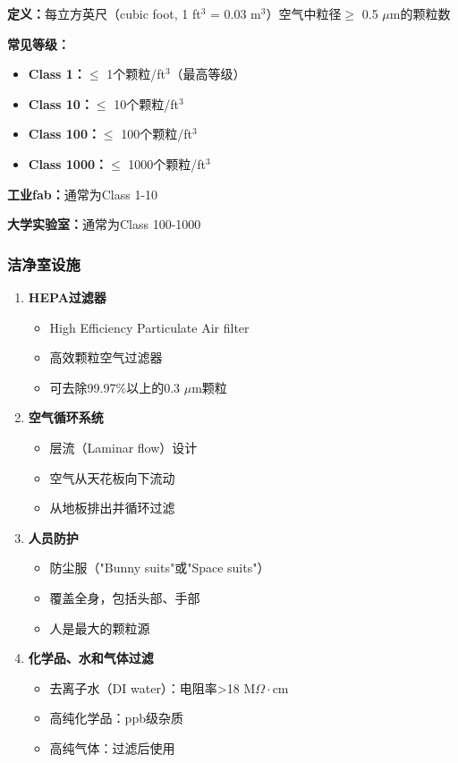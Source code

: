 \documentclass[UTF8,12pt,a4paper]{ctexart}
\begin{document}
\textbf{定义：}每立方英尺（cubic foot, 1 ft$^3$ = 0.03 m$^3$）空气中粒径$\geq$ 0.5 $\mu$m的颗粒数

\textbf{常见等级：}
\begin{itemize}
    \item \textbf{Class 1：}$\leq$ 1个颗粒/ft$^3$（最高等级）
    \item \textbf{Class 10：}$\leq$ 10个颗粒/ft$^3$
    \item \textbf{Class 100：}$\leq$ 100个颗粒/ft$^3$
    \item \textbf{Class 1000：}$\leq$ 1000个颗粒/ft$^3$
\end{itemize}

\textbf{工业fab：}通常为Class 1-10

\textbf{大学实验室：}通常为Class 100-1000

\subsubsection{洁净室设施}

\begin{enumerate}
    \item \textbf{HEPA过滤器}
    \begin{itemize}
        \item High Efficiency Particulate Air filter
        \item 高效颗粒空气过滤器
        \item 可去除99.97\%以上的0.3 $\mu$m颗粒
    \end{itemize}
    
    \item \textbf{空气循环系统}
    \begin{itemize}
        \item 层流（Laminar flow）设计
        \item 空气从天花板向下流动
        \item 从地板排出并循环过滤
    \end{itemize}
    
    \item \textbf{人员防护}
    \begin{itemize}
        \item 防尘服（"Bunny suits"或"Space suits"）
        \item 覆盖全身，包括头部、手部
        \item 人是最大的颗粒源
    \end{itemize}
    
    \item \textbf{化学品、水和气体过滤}
    \begin{itemize}
        \item 去离子水（DI water）：电阻率>18 M$\Omega\cdot$cm
        \item 高纯化学品：ppb级杂质
        \item 高纯气体：过滤后使用
    \end{itemize}
\end{enumerate}
\end{document}
